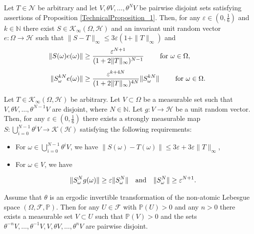 \documentclass[10pt,a4paper]{amsart}
\newcommand{\N}{\mathbb{N}}
\newcommand{\cF}{\mathcal{F}}
\newcommand{\cH}{\mathcal{H}}
\newcommand{\cK}{\mathcal{K}}
\newcommand{\eps}{\varepsilon}
\newcommand{\mP}{\mathbb{P}}
\begin{document}
\begin{proposition}\label{Millionschikov}
Let $T\in\mathcal N$ be arbitrary and let $V,\theta V,\dots, \theta^N V$ be pairwise disjoint sets satisfying assertions of Proposition \ref{TechnicalProposition_1}. Then, for any $\eps\in (0,\frac{1}{6})$ and $k\in \N$ there exist $S\in\cK_{\infty}(\Omega,\cH)$ and an invariant unit random vector $e:\Omega\rightarrow \cH$ such that $\|S-T\|_{\infty}\leq 3\eps (1+ \|T\|_{\infty})$ and
\begin{align}
\|S(\omega)e(\omega)\|
& \geq \frac{\eps^{N+1}}{(1+2\|T\|_{\infty})^{N-1}}\qquad\hbox{ for } \omega\in\Omega,\label{Lowerestimate}\\[1ex]
 \|S^{kN}_{\omega}e(\omega)\|
 & \geq  \frac{\eps^{k+4N}}{(1+2\|T\|_{\infty})^{4N}} \|S_{\omega}^{kN}\|\qquad\hbox{ for } \omega\in\Omega.\label{Goodgrowthrate}
\end{align}
\end{proposition}

\begin{lemma}\label{Perturbationalongashortperiod}
Let $T\in\cK_{\infty}(\Omega,\cH)$ be arbitrary. Let $V\subset \Omega$ be a measurable set such that $V,\theta V,\dots, \theta^{N-1} V$ are disjoint, where $N\in \mathbb N$.  Let $g: V\rightarrow \cH$ be a unit random vector. Then, for any $\eps\in (0,\frac{1}{6})$ there exists a strongly measurable map $S:\bigcup_{i=0}^{N-1} \theta^i V\rightarrow \mathcal K(\mathcal H)$ satisfying the following requirements:
\begin{itemize}
\item [(r1)] For $\omega\in \bigcup_{i=0}^{N-1} \theta^i V$, we have $\|S(\omega)-T(\omega)\|\leq 3\eps + 3\eps \|T\|_{\infty}$, 

\item [(r2)] For $\omega\in V$, we have 
 
\begin{equation}\label{Smallgrowth}
 \|S_{\omega}^N g(\omega)\|\geq \eps \|S_{\omega}^N\|\quad\hbox{and}  \quad \|S_{\omega}^N\|\geq \eps^{N+1}.
\end{equation}
\end{itemize}
\end{lemma}

\begin{theorem}\label{HR_Lemma}
Assume that $\theta$ is an ergodic invertible transformation of the non-atomic Lebesgue space $(\Omega,\mathcal F,\mathbb P)$. Then for any $U\in\cF$ with $\mP(U)>0$ and any $n > 0$ there exists a measurable set $V\subset U$ such that $\mP(V)>0$ and the sets $\theta^{-n}V,\dots,\theta^{-1}V,V,\theta V,\dots,\theta^n V$ are pairwise disjoint.
\end{theorem}
\end{document}
